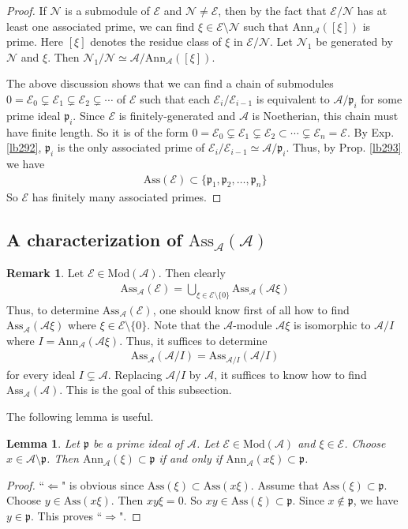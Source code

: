 \documentclass[12pt,b5paper,notitlepage]{report}
\theoremstyle{definition}
\newtheorem{rem}[df]{Remark}
\theoremstyle{plain}
\newtheorem{lm}[df]{Lemma}
\newcommand{\mc}{\mathcal}
\newcommand{\pk}{\mathfrak p}
\newcommand{\Ann}{\mathrm{Ann}}
\newcommand{\Mod}{\mathrm{Mod}}
\newcommand{\Ass}{\mathrm{Ass}}
\numberwithin{equation}{section}
\begin{document}
\begin{proof}
If $\mc N$ is a submodule of $\mc E$ and $\mc N\neq\mc E$, then by the fact that $\mc E/\mc N$ has at least one associated prime, we can find $\xi\in\mc E\setminus\mc N$ such that $\Ann_{\mc A}([\xi])$ is prime. Here $[\xi]$ denotes the residue class of $\xi$ in $\mc E/\mc N$. Let $\mc N_1$ be generated by $\mc N$ and $\xi$. Then $\mc N_1/\mc N\simeq \mc A/\Ann_{\mc A}([\xi])$.

The above discussion shows that we can find a chain of submodules $0=\mc E_0\subsetneq\mc E_1\subsetneq\mc E_2\subsetneq\cdots$ of $\mc E$ such that each $\mc E_i/\mc E_{i-1}$ is equivalent to $\mc A/\pk_i$ for some prime ideal $\pk_i$. Since $\mc E$ is finitely-generated and $\mc A$ is Noetherian, this chain must have finite length. So it is of the form $0=\mc E_0\subsetneq\mc E_1\subsetneq\mc E_2\subset\cdots\subsetneq\mc E_n=\mc E$. By Exp. \ref{lb292}, $\pk_i$ is the only associated prime of $\mc E_i/\mc E_{i-1}\simeq\mc A/\pk_i$. Thus, by Prop. \ref{lb293} we have
\begin{align}
\Ass(\mc E)\subset \{\pk_1,\pk_2,\dots,\pk_n\}
\end{align}
So $\mc E$ has finitely many associated primes.
\end{proof}


\subsection{A characterization of $\Ass_{\mc A}(\mc A)$}


\begin{rem}\label{lb371}
Let $\mc E\in\Mod(\mc A)$. Then clearly
\begin{align*}
\Ass_{\mc A}(\mc E)=\bigcup_{\xi\in\mc E\setminus\{0\}} \Ass_{\mc A}(\mc A\xi) 
\end{align*}
Thus, to determine $\Ass_{\mc A}(\mc E)$, one should know first of all how to find $\Ass_{\mc A}(\mc A\xi)$ where $\xi\in\mc E\setminus\{0\}$. Note that the $\mc A$-module $\mc A\xi$ is isomorphic to $\mc A/I$ where $I=\Ann_{\mc A}(\mc A\xi)$. Thus, it suffices to determine
\begin{align*}
\Ass_{\mc A}(\mc A/I)=\Ass_{\mc A/I}(\mc A/I)
\end{align*}
for every ideal $I\subsetneq\mc A$. Replacing $\mc A/I$ by $\mc A$, it suffices to know how to find $\Ass_{\mc A}(\mc A)$. This is the goal of this subsection.
\end{rem}

The following lemma is useful.
\begin{lm}\label{lb375}
Let $\pk$ be a prime ideal of $\mc A$. Let $\mc E\in\Mod(\mc A)$ and $\xi\in\mc E$. Choose $x\in\mc A\setminus\pk$. Then $\Ann_{\mc A}(\xi)\subset\pk$ if and only if $\Ann_{\mc A}(x\xi)\subset\pk$.
\end{lm}
\begin{proof}
``$\Leftarrow$" is obvious since $\Ass(\xi)\subset\Ass(x\xi)$. Assume that $\Ass(\xi)\subset\pk$. Choose $y\in\Ass(x\xi)$. Then $xy\xi=0$. So $xy\in\Ass(\xi)\subset\pk$. Since $x\notin\pk$, we have $y\in\pk$. This proves ``$\Rightarrow$".
\end{proof}
\end{document}
